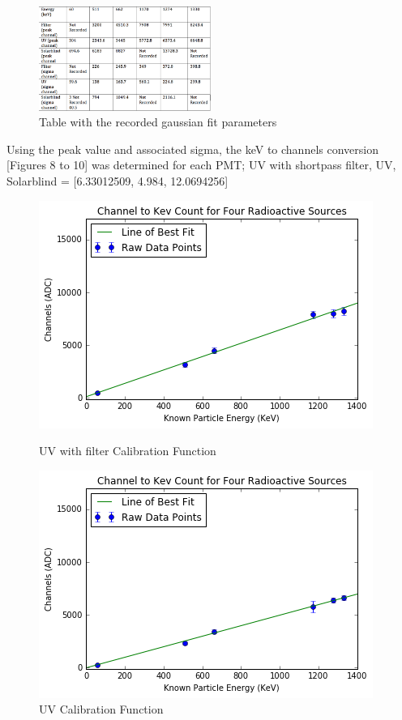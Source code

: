 \documentclass{article}
\begin{document}
\begin{figure}
  \centering
    \includegraphics[width=0.5\textwidth]{gaussfits.png}
  \caption{Table with the recorded gaussian fit parameters}
  \label{fig:workflowedge}
\end{figure} 

\noindent
Using the peak value and associated sigma, the keV to channels conversion [Figures 8 to 10] was determined for each PMT; UV with shortpass filter, UV, Solarblind = [6.33012509, 4.984, 12.0694256] 

\begin{figure}[H]
  \centering
  \begin{minipage}[b]{0.4\textwidth}
    \includegraphics[width=\textwidth]{chanf.png}
    \caption{UV with filter Calibration Function}
  \end{minipage}
  \hfill
  \begin{minipage}[b]{0.4\textwidth}
    \includegraphics[width=\textwidth]{chanuv.png}
    \caption{UV Calibration Function}
  \end{minipage}
\end{figure}
\end{document}
